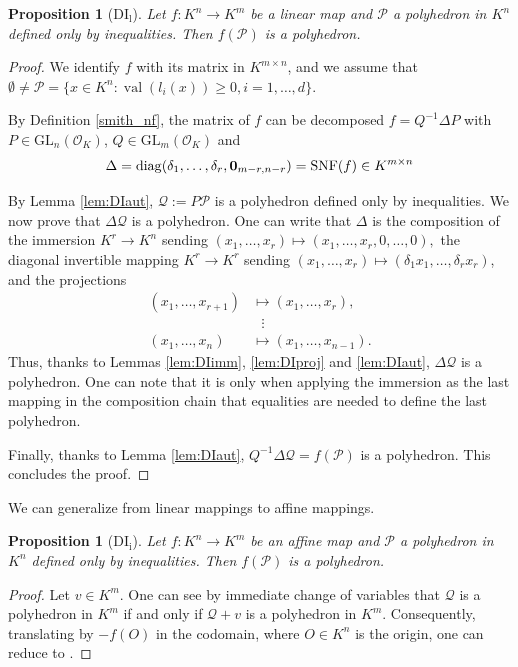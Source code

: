 \documentclass{elsarticle}
\theoremstyle{plain}
\newtheorem{proposition}[theorem]{Proposition}
\theoremstyle{definition}
\newcommand{\N}{\mathbb{N}} %
\newcommand{\PP}{\mathcal{P}}
\newcommand{\Qc}{\mathcal{Q}}
\DeclareMathOperator{\val}{val}
\newcommand{\OK}{\mathcal{O}_K}
\def\diag{\mathrm{diag}}
\newcommand{\GL}{\mathrm{GL}}
\begin{document}
\begin{proposition}[DI${}_{\mathrm{l}}$]
Let $f : K^n \to K^m$ be a linear map and $\PP$ a polyhedron in $K^n$ defined only by inequalities.
Then $f(\PP)$ is a polyhedron. \label{prop:DIl}
\end{proposition}
\begin{proof}
  We identify $f$ with its matrix in $K^{m \times n}$, and we
  assume that $\emptyset \neq \PP = \{x \in K^n : \val(l_i(x)) \geq 0, i=1,\ldots,d\}$.
  
  By Definition \ref{smith_nf}, the matrix of $f$ can be decomposed
  $f = Q^{-1} \Delta P$ with $P \in \GL_n(\OK)$, $Q \in \GL_m(\OK)$ and
  $$
  \Delta = \diag(\delta_1, \ldots, \delta_r, {\bf 0}_{m-r,n-r}) = \mathrm{SNF}(f)\in K^{m \times n}
  $$

By Lemma \ref{lem:DIaut}, $\Qc := P \PP$ is a polyhedron defined only by inequalities.
We now prove that $\Delta \Qc$ is a polyhedron. One can write that $\Delta$ is the composition
of the immersion 
$K^r \rightarrow K^n$ sending
$(x_1,\dots,x_r)\mapsto (x_1,\dots,x_r,0,\dots,0),$ 
 the diagonal invertible mapping
$K^r \rightarrow K^r$ sending
$(x_1,\dots,x_r)\mapsto (\delta_1 x_1,\dots,\delta_r x_r)$,
and the projections
\begin{equation*}
  \begin{aligned}
    (x_1,\dots,x_{r+1}) &\mapsto (x_1,\dots,x_{r}),   \\
    & \,\,\,\, \vdots \\
    (x_1,\dots,x_{n}) &\mapsto (x_1,\dots,x_{n-1}).
  \end{aligned}
\end{equation*}
Thus, thanks to Lemmas \ref{lem:DIimm}, \ref{lem:DIproj} and \ref{lem:DIaut},
$\Delta \Qc$ is a polyhedron. One can note that it is only when applying the
immersion as the last mapping in the composition chain that equalities are
needed to define the last polyhedron.

Finally, thanks to Lemma \ref{lem:DIaut},
$Q^{-1} \Delta \Qc = f(\PP)$ is a polyhedron.
This concludes the proof.
\end{proof}

We can generalize from linear mappings to affine mappings.
\begin{proposition}[DI${}_{\mathrm{i}}$]
Let $f : K^n \to K^m$ be an affine map and $\PP$ a polyhedron in $K^n$ defined only by inequalities.
Then $f(\PP)$ is a polyhedron. \label{prop:DIi}
\end{proposition}
\begin{proof}
  Let $v \in K^m$. One can see by immediate change
  of variables that $\Qc$ is a polyhedron in $K^m$ if and only if
  $\Qc+v$ is a polyhedron in $K^m$.
  Consequently, translating by $-f(O)$ in the codomain, where
  $O \in K^n$ is the origin, one can reduce to .
\end{proof}
\end{document}
